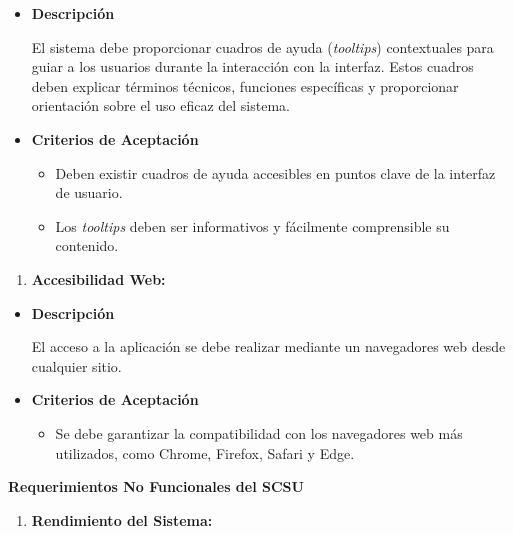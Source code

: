 \documentclass[
  12pt,
  openany]{book}
\providecommand{\tightlist}{%
  \setlength{\itemsep}{0pt}\setlength{\parskip}{0pt}}
\begin{document}
\begin{itemize}
\item
  \textbf{Descripción}

  El sistema debe proporcionar cuadros de ayuda (\emph{tooltips}) contextuales para guiar a los usuarios durante la interacción con la interfaz. Estos cuadros deben explicar términos técnicos, funciones específicas y proporcionar orientación sobre el uso eficaz del sistema.
\item
  \textbf{Criterios de Aceptación}

  \begin{itemize}
  \item
    Deben existir cuadros de ayuda accesibles en puntos clave de la interfaz de usuario.
  \item
    Los \emph{tooltips} deben ser informativos y fácilmente comprensible su contenido.
  \end{itemize}
\end{itemize}

\begin{enumerate}
\def\labelenumi{\arabic{enumi}.}
\setcounter{enumi}{8}
\tightlist
\item
  \textbf{Accesibilidad Web:}
\end{enumerate}

\begin{itemize}
\item
  \textbf{Descripción}

  El acceso a la aplicación se debe realizar mediante un navegadores web desde cualquier sitio.
\item
  \textbf{Criterios de Aceptación}

  \begin{itemize}
  \tightlist
  \item
    Se debe garantizar la compatibilidad con los navegadores web más utilizados, como Chrome, Firefox, Safari y Edge.
  \end{itemize}
\end{itemize}

\textbf{Requerimientos No Funcionales del SCSU}

\begin{enumerate}
\def\labelenumi{\arabic{enumi}.}
\tightlist
\item
  \textbf{Rendimiento del Sistema:}
\end{enumerate}
\end{document}
